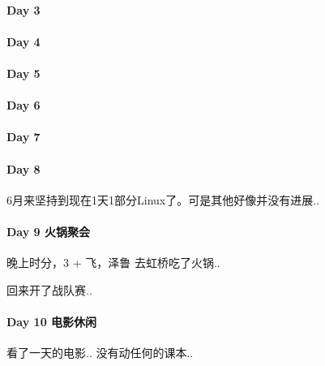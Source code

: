 \documentclass[UTF8,a4paper,8pt]{ctexart}
\begin{document}
 	 \paragraph{Day 3       \quad     }
 	 \paragraph{Day 4       \quad     }
 	 \paragraph{Day 5       \quad     }
 	 \paragraph{Day 6       \quad     }
 	 \paragraph{Day 7       \quad     }
 	 \paragraph{Day 8       \quad     }
 	 
	 	 6月来坚持到现在1天1部分Linux了。可是其他好像并没有进展..
	 	 
 	 \paragraph{Day 9   火锅聚会    \quad     }
	 	 晚上时分，3 + 飞，泽鲁 去虹桥吃了火锅..
	 	 
	 	 回来开了战队赛..
	 	 
 	 \paragraph{Day 10   电影休闲   \quad     }
	 	 看了一天的电影.. 没有动任何的课本.. 
	 	 
\end{document}
